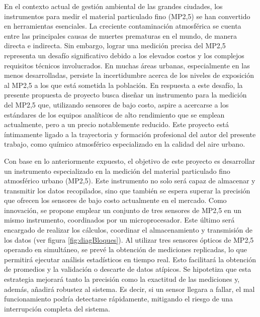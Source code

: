 
En el contexto actual de gestión ambiental de las grandes ciudades, los instrumentos para medir el material particulado fino (MP2,5) se han convertido en herramientas esenciales. La creciente contaminación atmosférica se cuenta entre las principales causas de muertes prematuras en el mundo, de manera directa e indirecta. Sin embargo, lograr una medición precisa del MP2,5 representa un desafío significativo debido a los elevados costos y los complejos requisitos técnicos involucrados. En muchas áreas urbanas, especialmente en las menos desarrolladas, persiste la incertidumbre acerca de los niveles de exposición al MP2,5 a los que está sometida la población. En respuesta a este desafío, la presente propuesta de proyecto busca diseñar un instrumento para la medición del MP2,5 que, utilizando sensores de bajo costo, aspire a acercarse a los estándares de los equipos analíticos de alto rendimiento que se emplean actualmente, pero a un precio notablemente reducido. Este proyecto está íntimamente ligado a la trayectoria y formación profesional del autor del presente trabajo, como químico atmosférico especializado en la calidad del aire urbano.

Con base en lo anteriormente expuesto, el objetivo de este proyecto es desarrollar un instrumento especializado en la medición del material particulado fino atmosférico urbano (MP2,5). Este instrumento no solo será capaz de almacenar y transmitir los datos recopilados, sino que también se espera superar la precisión que ofrecen los sensores de bajo costo actualmente en el mercado. Como innovación, se propone emplear un conjunto de tres sensores de MP2,5 en un mismo instrumento, coordinados por un microprocesador. Este último será encargado de realizar los cálculos, coordinar el almacenamiento y transmisión de los datos (ver figura \ref{fig:diagBloques}). Al utilizar tres sensores ópticos de MP2,5 operando en simultáneo, se prevé la obtención de mediciones replicadas, lo que permitirá ejecutar análisis estadísticos en tiempo real. Esto facilitará la obtención de promedios y la validación o descarte de datos atípicos. Se hipotetiza que esta estrategia mejorará tanto la precisión como la exactitud de las mediciones y, además, añadirá robustez al sistema. Es decir, si un sensor llegara a fallar, el mal funcionamiento podría detectarse rápidamente, mitigando el riesgo de una interrupción completa del sistema.

